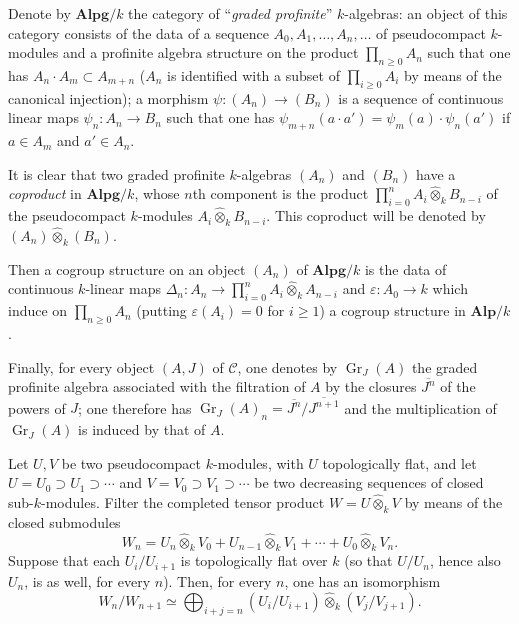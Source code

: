 Denote by $\mathbf{Alpg}/k$ the category of ``\emph{graded profinite}'' $k$-algebras: an object of this category consists of the data of a sequence $A_0,A_1,\ldots,A_n,\ldots$ of pseudocompact $k$-modules and a profinite algebra structure on the product $\prod_{n\ge0}A_n$ such that one has $A_n\cdot A_m\subset A_{m+n}$ ($A_n$ is identified with a subset of $\prod_{i\ge0}A_i$ by means of the canonical injection); a morphism $\psi:(A_n)\to(B_n)$ is a sequence of continuous linear maps $\psi_n:A_n\to B_n$ such that one has $\psi_{m+n}(a\cdot a')=\psi_m(a)\cdot\psi_n(a')$ if $a\in A_m$ and $a'\in A_n$.
\begin{definitions}{}
It is clear that two graded profinite $k$-algebras $(A_n)$ and $(B_n)$ have a \emph{coproduct} in $\mathbf{Alpg}/k$, whose $n$th component is the product $\prod_{i=0}^n A_i\widehat\otimes_k B_{n-i}$ of the pseudocompact $k$-modules $A_i\widehat\otimes_k B_{n-i}$. This coproduct will be denoted by $(A_n)\widehat\otimes_k(B_n)$.

Then a cogroup structure on an object $(A_n)$ of $\mathbf{Alpg}/k$ is the data of continuous $k$-linear maps $\Delta_n:A_n\to\prod_{i=0}^n A_i\widehat\otimes_k A_{n-i}$ and $\varepsilon:A_0\to k$ which induce on $\prod_{n\ge0}A_n$ (putting $\varepsilon(A_i)=0$ for $i\ge1$) a cogroup structure in $\mathbf{Alp}/k$.

Finally, for every object $(A,J)$ of $\mathscr C$, one denotes by $\operatorname{Gr}_J(A)$ the graded profinite algebra associated with the filtration of $A$ by the closures $\overline{J^n}$ of the powers of $J$; one therefore has $\operatorname{Gr}_J(A)_n=\overline{J^n}/\overline{J^{n+1}}$ and the multiplication of $\operatorname{Gr}_J(A)$ is induced by that of $A$.
\end{definitions}
\begin{lemma}{}
Let $U,V$ be two pseudocompact $k$-modules, with $U$ topologically flat, and let $U=U_0\supset U_1\supset\cdots$ and $V=V_0\supset V_1\supset\cdots$ be two decreasing sequences of closed sub-$k$-modules. Filter the completed tensor product $W=U\widehat\otimes_k V$ by means of the closed submodules
\[
W_n=U_n\widehat\otimes_k V_0+U_{n-1}\widehat\otimes_k V_1+\cdots+U_0\widehat\otimes_k V_n.
\]
Suppose that each $U_i/U_{i+1}$ is topologically flat over $k$ (so that $U/U_n$, hence also $U_n$, is as well, for every $n$). Then, for every $n$, one has an isomorphism
\[
W_n/W_{n+1}\simeq\bigoplus_{i+j=n}(U_i/U_{i+1})\widehat\otimes_k(V_j/V_{j+1}).
\]
\end{lemma}
